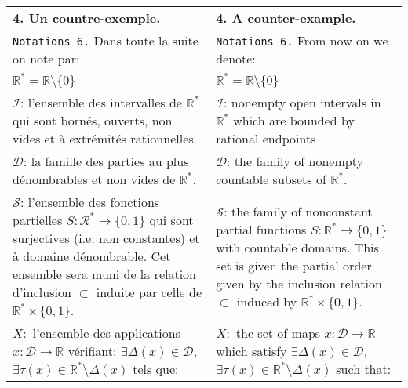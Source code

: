 \documentclass[12pt]{article}
\theoremstyle{plain}
\theoremstyle{definition}
\theoremstyle{remark}
\begin{document}
\begin{tabular}{p{2.8in} p{2.8in}}
\textbf{4. Un countre-exemple.}

&

\textbf{4. A counter-example.}

\\

\texttt{Notations 6.} Dans toute la suite on note par:

&

\texttt{Notations 6.} From now on we denote:

\\

$\mathbb{R}^* = \mathbb{R}\setminus\{0\}$

&

$\mathbb{R}^* = \mathbb{R}\setminus\{0\}$


\\

$\mathcal{I}$: l'ensemble des intervalles de $\mathbb{R}^*$ qui sont born\'es, ouverts, non vides et \`a extr\'emit\'es rationnelles.

&

$\mathcal{I}$: nonempty open intervals in $\mathbb{R}^*$ which are bounded by rational endpoints

\\

$\mathcal{D}$: la famille des parties au plus d\'enombrables et non vides de $\mathbb{R}^*$.

&

$\mathcal{D}$: the family of nonempty countable subsets of $\mathbb{R}^*$.

\\

$\mathcal{S}$: l'ensemble des fonctions partielles $S: \mathcal{R}^* \to \{0,1\}$ qui sont surjectives (i.e. non constantes) et \`a domaine d\'enombrable. Cet ensemble sera muni de la relation d'inclusion $\subset$ induite par celle de $\mathbb{R}^* \times \{0,1\}$.

&

$\mathcal{S}$: the family of nonconstant partial functions $S: \mathbb{R}^* \to \{0,1\}$ with countable domains. This set is given the partial order given by the inclusion relation $\subset$ induced by $\mathbb{R}^* \times \{0,1\}$.

\\

$X:$ l'ensemble des applications $x: \mathcal{D} \to \mathbb{R}$ v\'erifiant: $\exists \Delta(x) \in \mathcal{D}$, $\exists \tau(x) \in \mathbb{R}^* \setminus \Delta(x)$ tels que:

&

$X:$ the set of maps $x: \mathcal{D} \to \mathbb{R}$ which satisfy $\exists \Delta(x) \in \mathcal{D}$, $\exists \tau(x) \in \mathbb{R}^* \setminus \Delta(x)$ such that:

\end{tabular}
\end{document}
